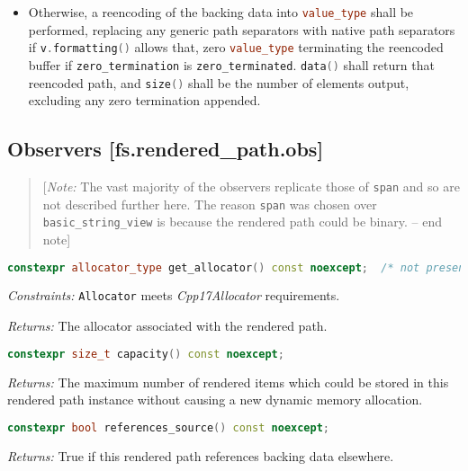 \documentclass[11pt]{article}
\newcommand{\code}[2][cpp]{\lstinline[language=#1,basicstyle=\small\ttfamily]{#2}}
\newcommand{\desc}[1]{\textit{#1}}
\newcommand{\constraints}{\desc{Constraints: }}
\newcommand{\returns}{\desc{Returns: }}
\newcommand{\note}[1]{\begin{quote}[\textit{Note:} #1 -- end note]\end{quote}}
\begin{document}
\begin{itemize}
    \item Otherwise, a reencoding of the backing data into \code{value_type} shall be performed, replacing any generic path separators with native path separators if \code{v.formatting()} allows that, zero \code{value_type} terminating the reencoded buffer if \code{zero_termination} is \code{zero_terminated}. \code{data()} shall return that reencoded path, and \code{size()} shall be the number of elements output, excluding any zero termination appended.

\end{itemize}

\subsection*{Observers [fs.rendered\_path.obs]}

\color{black}

\note{The vast majority of the observers replicate those of \code{span} and so are not described further here. The reason \code{span} was chosen over \code{basic_string_view} is because the rendered path could be binary.}

\color{darkgreen}

\begin{lstlisting}[language=cpp]
    constexpr allocator_type get_allocator() const noexcept;  /* not present if default_rendered_path_allocator tag type was used */
\end{lstlisting}

\constraints \code{Allocator} meets \emph{Cpp17Allocator} requirements.

\returns The allocator associated with the rendered path.\\


\begin{lstlisting}[language=cpp]
    constexpr size_t capacity() const noexcept;
\end{lstlisting}

\returns The maximum number of rendered items which could be stored in this rendered path instance without causing a new dynamic memory allocation.\\


\begin{lstlisting}[language=cpp]
    constexpr bool references_source() const noexcept;
\end{lstlisting}

\returns True if this rendered path references backing data elsewhere.\\
\end{document}

